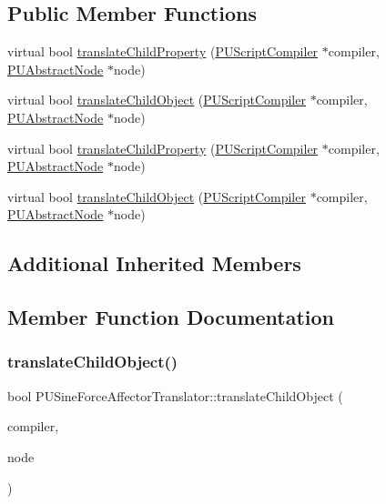 \subsection*{Public Member Functions}
\begin{DoxyCompactItemize}
\item 
virtual bool \hyperlink{classPUSineForceAffectorTranslator_a6a4e8154bd3164724c598e1e2243e96c}{translate\+Child\+Property} (\hyperlink{classPUScriptCompiler}{P\+U\+Script\+Compiler} $\ast$compiler, \hyperlink{classPUAbstractNode}{P\+U\+Abstract\+Node} $\ast$node)
\item 
virtual bool \hyperlink{classPUSineForceAffectorTranslator_af12df732d3712ac90bda04903fbc9f30}{translate\+Child\+Object} (\hyperlink{classPUScriptCompiler}{P\+U\+Script\+Compiler} $\ast$compiler, \hyperlink{classPUAbstractNode}{P\+U\+Abstract\+Node} $\ast$node)
\item 
virtual bool \hyperlink{classPUSineForceAffectorTranslator_ac76a64f5950e4b3bdf60e62f4f89e645}{translate\+Child\+Property} (\hyperlink{classPUScriptCompiler}{P\+U\+Script\+Compiler} $\ast$compiler, \hyperlink{classPUAbstractNode}{P\+U\+Abstract\+Node} $\ast$node)
\item 
virtual bool \hyperlink{classPUSineForceAffectorTranslator_abab95042ad737cf70fa69f834b848126}{translate\+Child\+Object} (\hyperlink{classPUScriptCompiler}{P\+U\+Script\+Compiler} $\ast$compiler, \hyperlink{classPUAbstractNode}{P\+U\+Abstract\+Node} $\ast$node)
\end{DoxyCompactItemize}
\subsection*{Additional Inherited Members}


\subsection{Member Function Documentation}
\mbox{\label{classPUSineForceAffectorTranslator_af12df732d3712ac90bda04903fbc9f30}} 
\subsubsection{\texorpdfstring{translate\+Child\+Object()}{translateChildObject()}\hspace{0.1cm}{\footnotesize\ttfamily [1/2]}}
{\footnotesize\ttfamily bool P\+U\+Sine\+Force\+Affector\+Translator\+::translate\+Child\+Object (\begin{DoxyParamCaption}\item[{\hyperlink{classPUScriptCompiler}{P\+U\+Script\+Compiler} $\ast$}]{compiler,  }\item[{\hyperlink{classPUAbstractNode}{P\+U\+Abstract\+Node} $\ast$}]{node }\end{DoxyParamCaption})\hspace{0.3cm}{\ttfamily [virtual]}}

